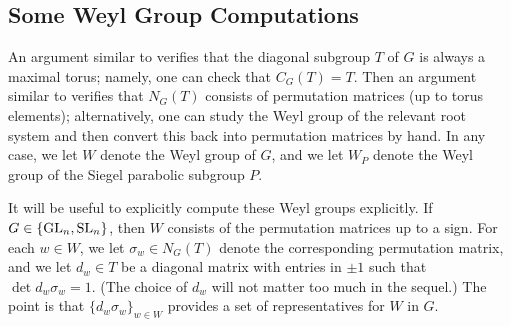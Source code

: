 \subsection{Some Weyl Group Computations}
An argument similar to \cite[Example~17.88]{milne-alg-group} verifies that the diagonal subgroup $T$ of $G$ is always a maximal torus; namely, one can check that $C_G(T)=T$. Then an argument similar to \cite[Example~17.42]{milne-alg-group} verifies that $N_G(T)$ consists of permutation matrices (up to torus elements); alternatively, one can study the Weyl group of the relevant root system and then convert this back into permutation matrices by hand. In any case, we let $W$ denote the Weyl group of $G$, and we let $W_P$ denote the Weyl group of the Siegel parabolic subgroup $P$.

It will be useful to explicitly compute these Weyl groups explicitly. If $G\in\{\mathrm{GL}_n,\mathrm{SL}_n\}$, then $W$ consists of the permutation matrices up to a sign. For each $w\in W$, we let $\sigma_w\in N_G(T)$ denote the corresponding permutation matrix, and we let $d_w\in T$ be a diagonal matrix with entries in $\pm1$ such that $\det d_w\sigma_w=1$. (The choice of $d_w$ will not matter too much in the sequel.) The point is that $\{d_w\sigma_w\}_{w\in W}$ provides a set of representatives for $W$ in $G$.

